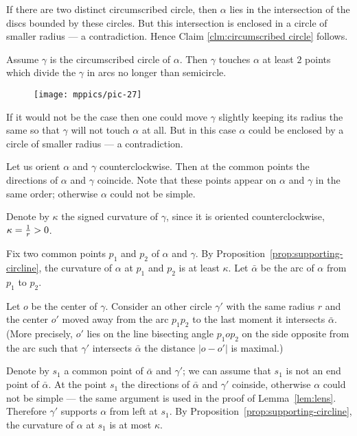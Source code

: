 If there are two distinct circumscribed circle, then $\alpha$ lies in the intersection of the discs bounded by these circles.
But this intersection is enclosed in a circle of smaller radius --- a contradiction.
Hence Claim \ref{clm:circumscribed circle} follows.


\begin{clm}{}
Assume $\gamma$ is the circumscribed circle of $\alpha$.
Then $\gamma$ touches $\alpha$ at least $2$ points which divide the $\gamma$ in arcs no longer than semicircle.
\end{clm}

\begin{wrapfigure}{R}{38 mm}
\vskip-0mm
\centering
\texttt{[image: mppics/pic-27]}
\vskip0mm
\end{wrapfigure}

If it would not be the case then one could move $\gamma$ slightly keeping its radius the same so that $\gamma$ will not touch $\alpha$ at all.
But in this case $\alpha$ could be enclosed by a circle of smaller radius --- a contradiction.


Let us orient $\alpha$ and $\gamma$ counterclockwise.
Then at the common points the directions of $\alpha$ and $\gamma$ coincide.
Note that these points appear on $\alpha$ and $\gamma$ in the same order;
otherwise $\alpha$ could not be simple.

Denote by $\kappa$ the signed curvature of $\gamma$, since it is oriented counterclockwise,
$\kappa\z=\tfrac1r>0$.
  
Fix two common points $p_1$ and $p_2$ of $\alpha$ and $\gamma$.
By Proposition~\ref{prop:supporting-circline}, the curvature of $\alpha$ at $p_1$ and $p_2$ is at least $\kappa$.
Let $\bar\alpha$ be the arc of $\alpha$ from $p_1$ to $p_2$.

Let $o$ be the center of $\gamma$.
Consider an other circle $\gamma'$ with the same radius $r$ and the center $o'$ moved away from the arc $p_1p_2$ to the last moment it intersects $\bar\alpha$.
(More precisely, $o'$ lies on the line bisecting angle $p_1op_2$ on the side opposite from the arc such that $\gamma'$ intersects $\bar\alpha$ the distance $|o-o'|$ is maximal.)

Denote by $s_1$ a common point of $\bar\alpha$ and $\gamma'$;
we can assume that $s_1$ is not an end point of $\bar\alpha$.
At the point $s_1$ the directions of $\bar\alpha$ and $\gamma'$ coinside,
otherwise $\alpha$ could not be simple --- the same argument is used in the proof of Lemma~\ref{lem:lens}.
Therefore $\gamma'$ supports $\alpha$ from left at $s_1$.
By Proposition~\ref{prop:supporting-circline}, the curvature of $\alpha$ at $s_1$ is at most $\kappa$.


